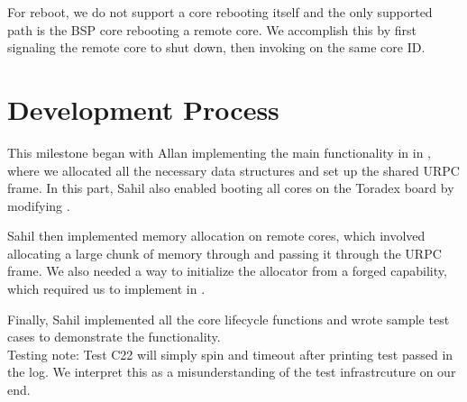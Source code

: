 \medskip\noindent
For reboot, we do not support a core rebooting itself and the only supported path is the BSP core
rebooting a remote core. We accomplish this by first signaling the remote core to shut down, then
invoking  on the same core ID.

\section{Development Process}

This milestone began with Allan implementing the main functionality in  in
, where we allocated all the necessary data structures and set up the
shared URPC frame. In this part, Sahil also enabled booting all cores on the Toradex board by
modifying .

\medskip\noindent
Sahil then implemented memory allocation on remote cores, which involved allocating a large chunk of
memory through  and passing it through the URPC frame. We also needed a way to
initialize the allocator from a forged capability, which required us to implement
 in .

\medskip\noindent
Finally, Sahil implemented all the core lifecycle functions and wrote sample test cases to demonstrate
the functionality.
\\
 \newline
Testing note: Test C22 will simply spin and timeout after printing test passed in the log. We interpret this as a misunderstanding of the test infrastrcuture on our end.